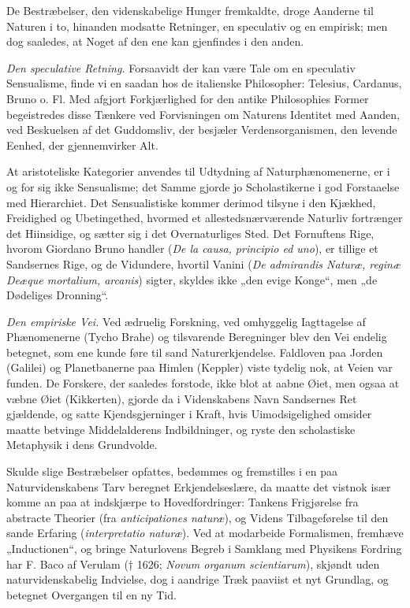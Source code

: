 \documentclass[12pt]{book}
\newcommand{\opage}[1]{\marginnote{\footnotesize\textit{[#1]}}}
\begin{document}
De Bestræbelser, den videnskabelige Hunger fremkaldte, droge Aanderne til Naturen
i to, hinanden modsatte Retninger, en speculativ og en empirisk; men dog saaledes,
at Noget af den ene kan gjenfindes i den anden.

\emph{Den speculative Retning.} Forsaavidt der kan være Tale om en speculativ
Sensualisme, finde vi en saadan hos de italienske Philosopher: Telesius, Cardanus,
Bruno o. Fl. Med afgjort Forkjærlighed for den antike Philosophies Former
begeistredes disse Tænkere ved Forvisningen om Naturens Identitet med Aanden, ved
Beskuelsen af det Guddomsliv, der besjæler Verdensorganismen, den levende Eenhed,
der gjennemvirker Alt.

At aristoteliske Kategorier anvendes til Udtydning af Naturphænomenerne, er i og
for sig ikke Sensualisme; det Samme gjorde jo Scholastikerne i god Forstaaelse med
Hierarchiet. Det Sensualistiske kommer derimod tilsyne i den Kjækhed, Freidighed
og Ubetingethed, hvormed et allestedsnærværende Naturliv fortrænger det Hiinsidige,
og sætter sig i det Overnaturliges Sted. Det Fornuftens Rige, hvorom Giordano Bruno
handler (\textit{De la causa, principio ed uno}),
\opage{10} er tillige et Sandsernes Rige, og de Vidundere, hvortil Vanini (\textit{De
admirandis Naturæ, reginæ Deæque mortalium, arcanis}) sigter, skyldes ikke „den
evige Konge“, men „de Dødeliges Dronning“.

\emph{Den empiriske Vei.} Ved ædruelig Forskning, ved omhyggelig Iagttagelse af
Phænomenerne (Tycho Brahe) og tilsvarende Beregninger blev den Vei endelig
betegnet, som ene kunde føre til sand Naturerkjendelse. Faldloven paa Jorden
(Galilei) og Planetbanerne paa Himlen (Keppler) viste tydelig nok, at Veien var
funden. De Forskere, der saaledes forstode, ikke blot at aabne Øiet, men ogsaa at
væbne Øiet (Kikkerten), gjorde da i Videnskabens Navn Sandsernes Ret gjældende, og
satte Kjendsgjerninger i Kraft, hvis Uimodsigelighed omsider maatte betvinge
Middelalderens Indbildninger, og ryste den scholastiske Metaphysik i dens
Grundvolde.

Skulde slige Bestræbelser opfattes, bedømmes og fremstilles i en paa
Naturvidenskabens Tarv beregnet Erkjendelseslære, da maatte det vistnok især komme
an paa at indskjærpe to Hovedfordringer: Tankens Frigjørelse fra abstracte Theorier
(fra \textit{anticipationes naturæ}), og Videns Tilbageførelse til den sande
Erfaring (\textit{interpretatio naturæ}). Ved at modarbeide Formalismen, fremhæve
„Inductionen“, og bringe Naturlovens Begreb i Samklang med Physikens Fordring har
F. Baco af Verulam († 1626; \textit{Novum organum scientiarum}), skjøndt uden
naturvidenskabelig Indvielse, dog i aandrige Træk paaviist et nyt Grundlag, og
betegnet Overgangen til en ny Tid.
\end{document}
